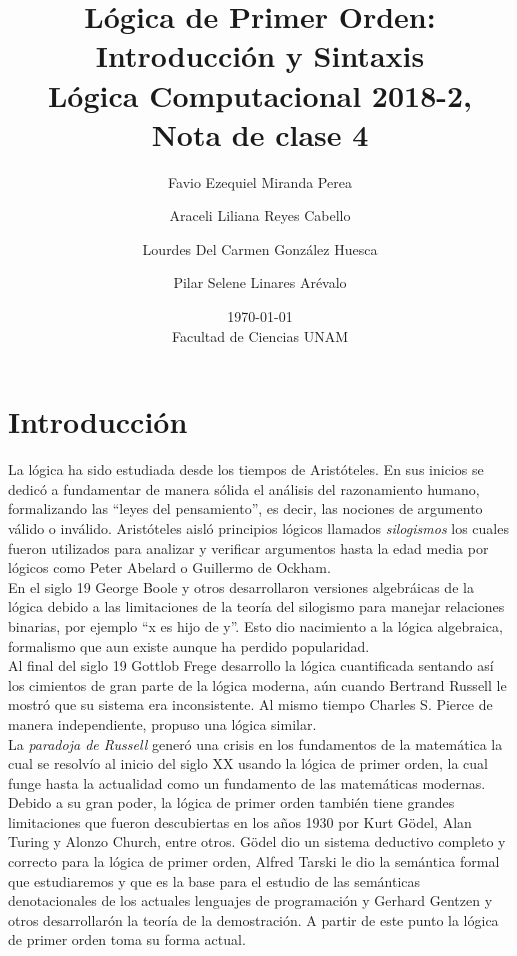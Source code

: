 \documentclass[11pt,letterpaper]{article}
\title{Lógica de Primer Orden: Introducción y Sintaxis \\ 
L\'ogica Computacional 2018-2, Nota de clase 4}
\author{Favio Ezequiel Miranda Perea\and Araceli Liliana Reyes Cabello\and
Lourdes Del Carmen Gonz\'alez Huesca \and Pilar Selene Linares Ar\'evalo}
\date{\today\\ Facultad de Ciencias UNAM}
\begin{document}
\maketitle

\section{Introducción}

La lógica ha sido estudiada desde los tiempos de Aristóteles. En sus inicios
se dedicó a fundamentar de manera sólida el análisis del razonamiento
humano, formalizando las \enquote{leyes del pensamiento}, es decir, las 
nociones de argumento válido o inválido. 
Aristóteles aisló principios lógicos llamados
\emph{silogismos} los cuales fueron utilizados para analizar y verificar
argumentos hasta la edad media por lógicos como Peter Abelard o Guillermo de 
Ockham.\\

En el siglo 19 George Boole y otros desarrollaron versiones algebráicas de la
lógica debido a las limitaciones de la teoría del silogismo para manejar
relaciones binarias, por ejemplo \enquote{x es hijo de y}. 
Esto dio nacimiento a la lógica algebraica, formalismo que aun existe aunque ha 
perdido popularidad.\\

Al final del siglo 19 Gottlob Frege desarrollo la lógica cuantificada
sentando así los cimientos de gran parte de la lógica moderna, aún cuando
Bertrand Russell le mostró que su sistema era inconsistente. Al mismo tiempo
Charles S. Pierce de manera independiente, propuso una lógica similar.\\

La \emph{paradoja de Russell} generó una crisis en los fundamentos de la
matemática la cual se resolvío al inicio del siglo XX usando la lógica de
primer orden, la cual funge hasta la actualidad como un fundamento
de las matemáticas modernas.
Debido a su gran poder, la lógica de primer orden también tiene grandes
limitaciones que fueron descubiertas en los años 1930 por Kurt Gödel,
Alan Turing y Alonzo Church, entre otros. Gödel dio un sistema
deductivo completo y correcto para la lógica de primer orden, Alfred Tarski
le dio la semántica formal que estudiaremos y que es la base para el estudio
de las semánticas denotacionales de los actuales lenguajes de programación y
Gerhard Gentzen y otros desarrollarón la teoría de la demostración. A partir de
este punto la lógica de primer orden toma su forma actual.\\
\end{document}
